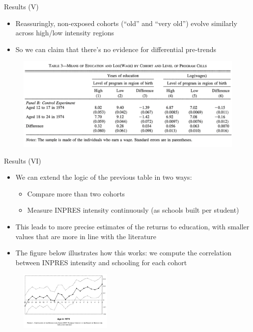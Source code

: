 \documentclass[11pt,notes=hide,aspectratio=169,mathserif]{beamer}
\begin{document}
\begin{frame}{Results (V)}
\begin{itemize}
    \item Reassuringly, non-exposed cohorts (``old'' and ``very old'') evolve similarly across high/low intensity regions
     \item So we can claim that there's no evidence for differential pre-trends 
\end{itemize}
\begin{figure}
    \centering
    \includegraphics[width=\textwidth]{inputs/Table3b.png}
\end{figure}
\end{frame}

\begin{frame}{Results (VI)}
\begin{itemize}
\item We can extend the logic of the previous table in two ways:
\begin{itemize}
     \item Compare more than two cohorts
     \item Measure INPRES intensity continuously (as schools built per student)
\end{itemize}
 \item This leads to more precise estimates of the returns to education, with smaller values that are more in line with the literature
 \item The figure below illustrates how this works: we compute the correlation between INPRES intensity and schooling for each cohort
\end{itemize}
\begin{figure}
    \centering
    \includegraphics[width=0.4\textwidth]{inputs/Figure1.png}
\end{figure}
\end{frame}
\end{document}
